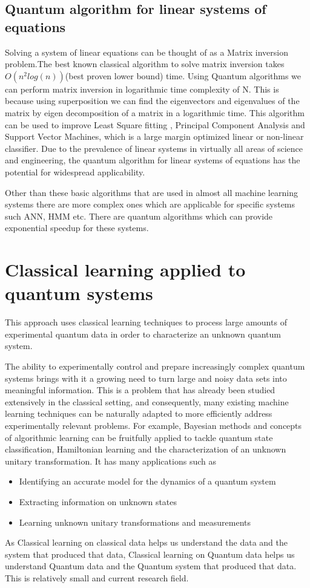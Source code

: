 \subsection{Quantum algorithm for linear systems of equations}
Solving a system of linear equations can be thought of as a Matrix inversion problem.The best known classical algorithm to solve matrix inversion takes $O(n^2log(n))$(best proven lower bound) time. Using Quantum algorithms\cite{matinv} we can perform matrix inversion in logarithmic time complexity of N. This is because using superposition we can find the eigenvectors and eigenvalues of the matrix by eigen decomposition of a matrix in a logarithmic time. This algorithm can be used to improve Least Square fitting , Principal Component Analysis and Support Vector Machines, which is a large margin optimized linear or non-linear classifier.
Due to the prevalence of linear systems in virtually all areas of science and engineering, the quantum algorithm for linear systems of equations has the potential for widespread applicability.\par\bigskip

Other than these basic algorithms that are used in almost all machine learning systems there are more complex ones which are applicable for specific systems such ANN, HMM etc. There are quantum algorithms which can provide exponential speedup for these systems.

\section{Classical learning applied to quantum systems} 
This approach uses classical learning techniques to process large amounts of experimental quantum data in order to characterize an unknown quantum system.\par\bigskip
The ability to experimentally control and prepare increasingly complex quantum systems brings with it a growing need to turn large and noisy data sets into meaningful information. This is a problem that has already been studied extensively in the classical setting, and consequently, many existing machine learning techniques can be naturally adapted to more efficiently address experimentally relevant problems. For example, Bayesian methods and concepts of algorithmic learning can be fruitfully applied to tackle quantum state classification, Hamiltonian learning and the characterization of an unknown unitary transformation.
It has many applications such as 
\begin{itemize}
\item Identifying an accurate model for the dynamics of a quantum system
\item Extracting information on unknown states
\item Learning unknown unitary transformations and measurements
\end{itemize}
As Classical learning on classical data helps us understand the data and the system that produced that data, Classical learning on Quantum data helps us understand Quantum data and the Quantum system that produced that data. 
This is relatively small and current research field. 


